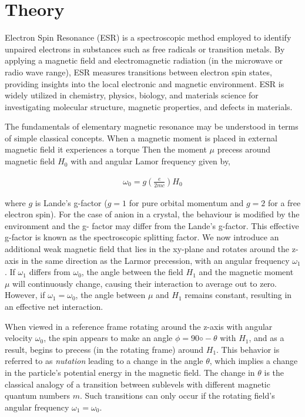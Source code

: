 \section{Theory}
Electron Spin Resonance (ESR) is a spectroscopic method employed to identify unpaired electrons in substances such as free radicals or transition metals. By applying a magnetic field and electromagnetic radiation (in the microwave or radio wave range), ESR measures transitions between electron spin states, providing insights into the local electronic and magnetic environment. ESR is widely utilized in chemistry, physics, biology, and materials science for investigating molecular structure, magnetic properties, and defects in materials.

The fundamentals of elementary magnetic resonance may be understood in terms of simple classical concepts. When a magnetic moment is placed in external magnetic field it experiences a torque Then the moment $\mu$ precess around magnetic field $H_0$ with
and angular Lamor frequency given by,

\begin{align}
    \omega_0 = g\left(\frac{e}{2mc}\right)H_0
\end{align}

where $g$ is Lande's g-factor ($g=1$ for pure orbital
momentum and $g=2$ for a free electron spin). For
the case of anion in a crystal, the behaviour is
modified by the environment and the g- factor may
differ from the Lande's g-factor.
This effective g-factor is known as the spectroscopic splitting factor.
We now introduce an additional weak magnetic
field that lies in the xy-plane and rotates around
the z-axis in the same direction as the Larmor
precession, with an angular frequency $\omega_1$.
If $\omega_1$
differs from $\omega_0$, the angle between the field $H_1$ and
the magnetic moment $\mu$ will continuously change,
causing their interaction to average out to zero.
However, if $\omega_1=\omega_0$, the angle between $\mu$ and
$H_1$ remains constant, resulting in an effective net
interaction.

When viewed in a reference frame rotating around
the z-axis with angular velocity $\omega_0$, the spin appears
to make an angle $\phi = 90◦ - \theta$ with $H_1$, and as
a result, begins to precess (in the rotating frame)
around $H_1$. This behavior is referred to as \textit{nutation} leading to a change in the angle $\theta$, which implies a change in the particle's potential energy in the
magnetic field. The change in $\theta$ is the classical analogy of a transition between sublevels with different
magnetic quantum numbers $m$. Such transitions can
only occur if the rotating field's angular frequency
$\omega_1=\omega_0$.

